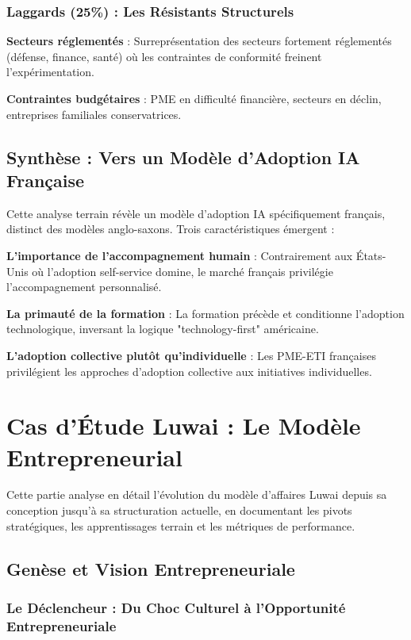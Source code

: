 \documentclass[12pt,a4paper]{report}
\begin{document}
\subsection{Laggards (25\%) : Les Résistants Structurels}

\textbf{Secteurs réglementés} : Surreprésentation des secteurs fortement réglementés (défense, finance, santé) où les contraintes de conformité freinent l'expérimentation.

\textbf{Contraintes budgétaires} : PME en difficulté financière, secteurs en déclin, entreprises familiales conservatrices.

\section{Synthèse : Vers un Modèle d'Adoption IA Française}

Cette analyse terrain révèle un modèle d'adoption IA spécifiquement français, distinct des modèles anglo-saxons. Trois caractéristiques émergent :

\textbf{L'importance de l'accompagnement humain} : Contrairement aux États-Unis où l'adoption self-service domine, le marché français privilégie l'accompagnement personnalisé.

\textbf{La primauté de la formation} : La formation précède et conditionne l'adoption technologique, inversant la logique "technology-first" américaine.

\textbf{L'adoption collective plutôt qu'individuelle} : Les PME-ETI françaises privilégient les approches d'adoption collective aux initiatives individuelles.

\chapter{Cas d'Étude Luwai : Le Modèle Entrepreneurial}

Cette partie analyse en détail l'évolution du modèle d'affaires Luwai depuis sa conception jusqu'à sa structuration actuelle, en documentant les pivots stratégiques, les apprentissages terrain et les métriques de performance.

\section{Genèse et Vision Entrepreneuriale}

\subsection{Le Déclencheur : Du Choc Culturel à l'Opportunité Entrepreneuriale}
\end{document}
